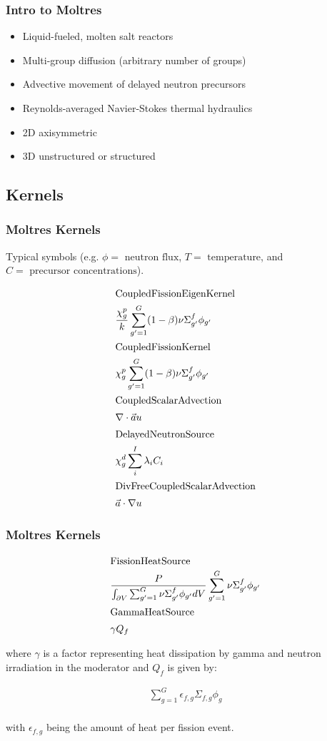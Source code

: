 \begin{frame}
	\frametitle{Intro to Moltres}
    	\begin{itemize}
			\item Liquid-fueled, molten salt reactors
			\item Multi-group diffusion (arbitrary number of groups)
			\item Advective movement of delayed neutron precursors
			\item Reynolds-averaged Navier-Stokes thermal hydraulics
			\item 2D axisymmetric
			\item 3D unstructured or structured
	    \end{itemize}
\end{frame}

\subsection{Kernels}
\begin{frame}
        \frametitle{Moltres Kernels}
        \footnotesize{Typical symbols (e.g. $\phi=\mbox{ neutron flux}$, 
                $T=\mbox{ temperature}$, and $C=\mbox{ precursor 
                concentrations}$).

\begin{align*}
\intertext{CoupledFissionEigenKernel} 
&\frac{\chi_g^p}{k} \sum_{g' = 1}^G (1 -
        \beta) \nu \Sigma_{g'}^f \phi_{g'}\\
\intertext{CoupledFissionKernel} 
&\chi_g^p \sum_{g' = 1}^G (1 -
        \beta) \nu \Sigma_{g'}^f \phi_{g'}\\
\intertext{CoupledScalarAdvection} 
&\nabla \cdot \vec{a} u\\
\intertext{DelayedNeutronSource} 
&\chi_g^d \sum_i^I \lambda_i C_i\\
\intertext{DivFreeCoupledScalarAdvection}
&\vec{a} \cdot \nabla u
\end{align*}}
\end{frame}

\begin{frame}
        \frametitle{Moltres Kernels}
        \footnotesize{
\begin{align*}
\intertext{FissionHeatSource}
&\frac{P}{\int_{\partial V} \sum_{g' = 1}^G \nu \Sigma_{g'}^f \phi_{g'} dV}
\sum_{g' = 1}^G \nu \Sigma_{g'}^f \phi_{g'}\\
\intertext{GammaHeatSource} &\gamma Q_f\\
\end{align*}

where $\gamma$ is a factor
representing heat dissipation by gamma and neutron irradiation in the moderator
and $Q_f$ is given by:

\begin{align*}
\sum_{g=1}^G \epsilon_{f,g}\Sigma_{f,g}\phi_g\\
\end{align*}

with $\epsilon_{f,g}$ being the amount of heat per fission event.}
\end{frame}

